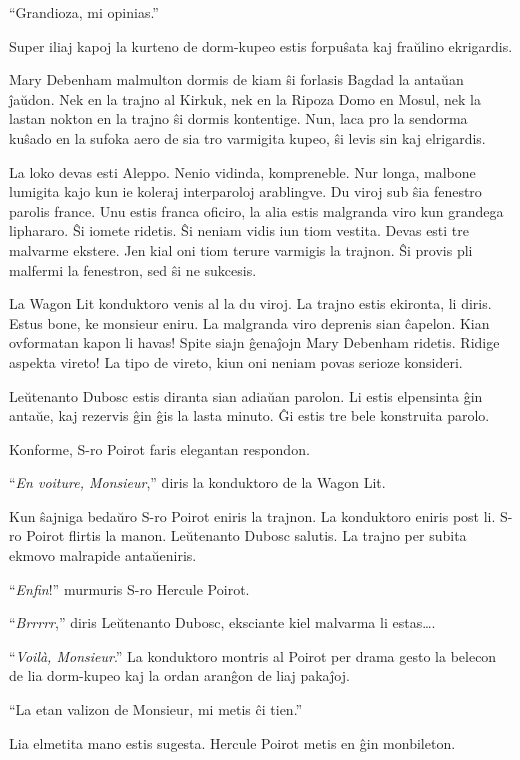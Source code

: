 ``Grandioza, mi opinias.''

Super iliaj kapoj la kurteno de dorm-kupeo estis forpuŝata kaj fraŭlino ekrigardis.

Mary Debenham malmulton dormis de kiam ŝi forlasis Bagdad la antaŭan ĵaŭdon. Nek en la trajno al Kirkuk, nek en la Ripoza Domo en Mosul, nek la lastan nokton en la trajno ŝi dormis kontentige. Nun, laca pro la sendorma kuŝado en la sufoka aero de sia tro varmigita kupeo, ŝi levis sin kaj elrigardis.

La loko devas esti Aleppo. Nenio vidinda, kompreneble. Nur longa, malbone lumigita kajo kun ie koleraj interparoloj arablingve. Du viroj sub ŝia fenestro parolis france. Unu estis franca oficiro, la alia estis malgranda viro kun grandega liphararo. Ŝi iomete ridetis. Ŝi neniam vidis iun tiom vestita. Devas esti tre malvarme ekstere. Jen kial oni tiom terure varmigis la trajnon. Ŝi provis pli malfermi la fenestron, sed ŝi ne sukcesis.

La Wagon Lit konduktoro venis al la du viroj. La trajno estis ekironta, li diris. Estus bone, ke monsieur eniru. La malgranda viro deprenis sian ĉapelon. Kian ovformatan kapon li havas! Spite siajn ĝenaĵojn Mary Debenham ridetis. Ridige aspekta vireto! La tipo de vireto, kiun oni neniam povas serioze konsideri.

Leŭtenanto Dubosc estis diranta sian adiaŭan parolon. Li estis elpensinta ĝin antaŭe, kaj rezervis ĝin ĝis la lasta minuto. Ĝi estis tre bele konstruita parolo.

Konforme, S-ro Poirot faris elegantan respondon.

``\emph{En voiture, Monsieur},'' diris la konduktoro de la Wagon Lit.

Kun ŝajniga bedaŭro S-ro Poirot eniris la trajnon. La konduktoro eniris post li. S-ro Poirot flirtis la manon. Leŭtenanto Dubosc salutis. La trajno per subita ekmovo malrapide antaŭeniris.

``\emph{Enfin}!'' murmuris S-ro Hercule Poirot.

``\emph{Brrrrr},'' diris Leŭtenanto Dubosc, eksciante kiel malvarma li estas{\ldots}.

\sectionbreak

``\emph{Voilà, Monsieur}.'' La konduktoro montris al Poirot per drama gesto la belecon de lia dorm-kupeo kaj la ordan aranĝon de liaj pakaĵoj.

``La etan valizon de Monsieur, mi metis ĉi tien.''

Lia elmetita mano estis sugesta. Hercule Poirot metis en ĝin monbileton.

